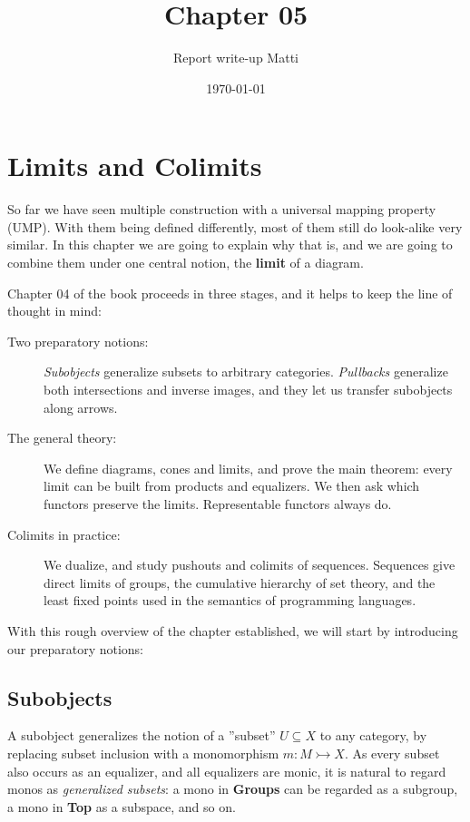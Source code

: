 \documentclass[11pt]{article}
\title{Chapter 05}
\author{Report write-up Matti}
\date{\today}
\begin{document}
\maketitle
\tableofcontents

\section{Limits and Colimits}

So far we have seen multiple construction with a universal mapping property
(UMP). With them being defined differently, most of them still do look-alike
very similar. In this chapter we are going to explain why that is, and we are
going to combine them under one central notion, the \textbf{limit} of a
diagram.

Chapter 04 of the book proceeds in three stages, and it helps to keep the line
of thought in mind:
\begin{description}
  \item[Two preparatory notions:] \textit{Subobjects} generalize subsets to
    arbitrary categories. \textit{Pullbacks} generalize both intersections and
    inverse images, and they let us transfer subobjects along arrows.
  \item[The general theory:] We define diagrams, cones and limits, and prove
    the main theorem: every limit can be built from products and equalizers. We
    then ask which functors preserve the limits. Representable functors always
    do.
  \item[Colimits in practice:] We dualize, and study pushouts and colimits of
    sequences. Sequences give direct limits of groups, the cumulative hierarchy
    of set theory, and the least fixed points used in the semantics of
    programming languages.
\end{description}

With this rough overview of the chapter established, we will start by
introducing our preparatory notions:

\subsection{Subobjects}

A subobject generalizes the notion of a ''subset'' $U \subseteq X$ to any
category, by replacing subset inclusion with a monomorphism $m: M
\rightarrowtail X$. As every subset also occurs as an equalizer, and all
equalizers are monic, it is natural to regard monos as \textit{generalized
subsets}: a mono in \textbf{Groups} can be regarded as a subgroup, a mono in
\textbf{Top} as a subspace, and so on.
\end{document}
